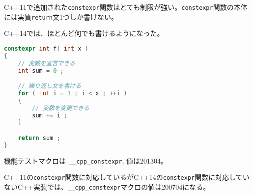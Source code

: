 %

C++11で追加された\lstinline!constexpr!関数はとても制限が強い。\lstinline!constexpr!関数の本体には実質\lstinline!return!文1つしか書けない。

C++14では、ほとんど何でも書けるようになった。

\begin{lstlisting}[language=C++]
constexpr int f( int x )
{
    // 変数を宣言できる
    int sum = 0 ;

    // 繰り返し文を書ける
    for ( int i = 1 ; i < x ; ++i )
    {
        // 変数を変更できる
        sum += i ;
    }

    return sum ;
}
\end{lstlisting}

機能テストマクロは~\lstinline!__cpp_constexpr!, 値は201304。

C++11の\lstinline!constexpr!関数に対応しているがC++14の\lstinline!constexpr!関数に対応していないC++実装では、\lstinline!__cpp_constexpr!マクロの値は200704になる。
